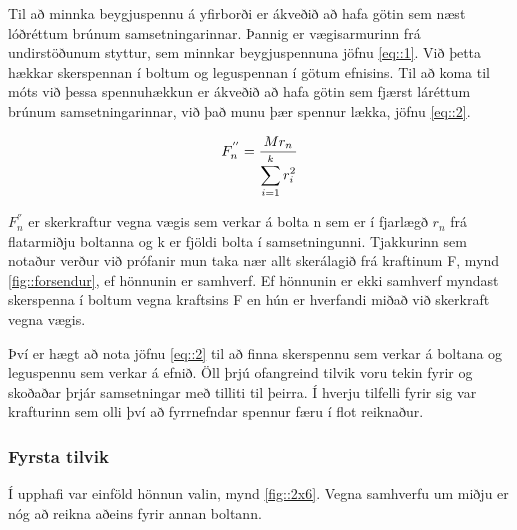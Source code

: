 Til að minnka beygjuspennu á yfirborði er ákveðið að hafa götin sem næst lóðréttum brúnum samsetningarinnar.
Þannig er vægisarmurinn frá undirstöðunum styttur, sem minnkar beygjuspennuna \sbr jöfnu \ref{eq::1}. 
Við þetta hækkar skerspennan í boltum og leguspennan í götum efnisins. 
Til að koma til móts við þessa spennuhækkun er ákveðið að hafa götin sem fjærst láréttum brúnum samsetningarinnar, við það munu þær spennur lækka, \sbr jöfnu \ref{eq::2}\cite{shigleys}.

\begin{equation}
  F_n^{''} = {
    M r_n 
    \over 
    \displaystyle\sum_{i=1}^{k} r_i^2
  }
  \label{eq::2}
\end{equation}

$F_n^{''}$ er skerkraftur vegna vægis sem verkar á bolta n sem er í fjarlægð $r_n$ frá flatarmiðju boltanna og k er fjöldi bolta í samsetningunni. Tjakkurinn sem notaður verður við prófanir mun taka nær allt skerálagið frá kraftinum F, \sbr mynd \ref{fig::forsendur}, ef hönnunin er samhverf. Ef hönnunin er ekki samhverf myndast skerspenna í boltum vegna kraftsins F en hún er hverfandi miðað við skerkraft vegna vægis.

Því er hægt að nota jöfnu \ref{eq::2} til að finna skerspennu sem verkar á boltana og leguspennu sem verkar á efnið. 
Öll þrjú ofangreind tilvik voru tekin fyrir og skoðaðar þrjár samsetningar með tilliti til þeirra.
Í hverju tilfelli fyrir sig var krafturinn sem olli því að fyrrnefndar spennur færu í flot reiknaður.

\subsubsection{Fyrsta tilvik}

Í upphafi var einföld hönnun valin, \sbr mynd \ref{fig::2x6}. Vegna samhverfu um miðju er nóg að reikna aðeins fyrir annan boltann.

